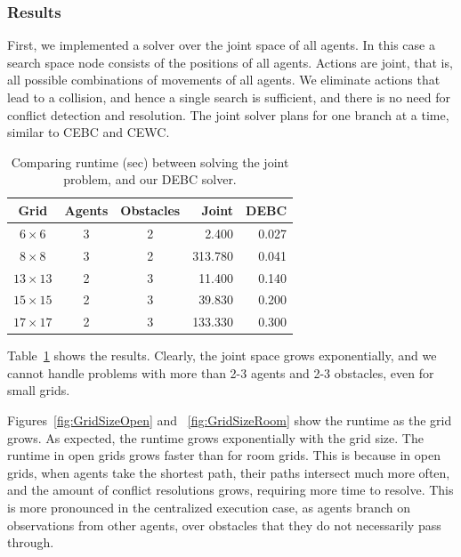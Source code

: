 \documentclass[letterpaper]{article} %
\begin{document}
\subsubsection{Results}

First, we implemented a solver over the joint space of all agents. In this case a search space node consists of the positions of all agents. Actions are joint, that is, all possible combinations of movements of all agents. We eliminate actions that lead to a collision, and hence a single search is sufficient, and there is no need for conflict detection and resolution. The joint solver plans for one branch at a time, similar to CEBC and CEWC.

\begin{table}[t]
\centering
\scriptsize
\begin{tabular}{| c | c | c | r | r |}
\hline
Grid & Agents & Obstacles & Joint & DEBC \\ \hline
$6 \times 6$ & 3   & 2 & 2.400 & 0.027 \\ \hline
$8 \times 8$ & 3   & 2 & 313.780 & 0.041 \\ \hline
$13 \times 13$ & 2   & 3 & 11.400 & 0.140 \\ \hline
$15 \times 15$ & 2   & 3 & 39.830 & 0.200 \\ \hline
$17 \times 17$ & 2   & 3 & 133.330 & 0.300 \\ \hline
\end{tabular}
\caption{Comparing runtime (sec) between solving the joint problem, and our DEBC solver.}
\label{tbl:joint}
\end{table}

Table~\ref{tbl:joint} shows the results. Clearly, the joint space grows exponentially, and we cannot handle problems with more than 2-3 agents and 2-3 obstacles, even for small grids. 



Figures~\ref{fig:GridSizeOpen} and ~\ref{fig:GridSizeRoom} show the runtime as the grid grows. As expected, the runtime grows exponentially with the grid size. The runtime in open grids grows faster than for room grids. This is because in open grids, when agents take the shortest path, their paths intersect much more often, and the amount of conflict resolutions grows, requiring more time to resolve. This is more pronounced in the centralized execution case, as agents branch on observations from other agents, over obstacles that they do not necessarily pass through. 
\end{document}
